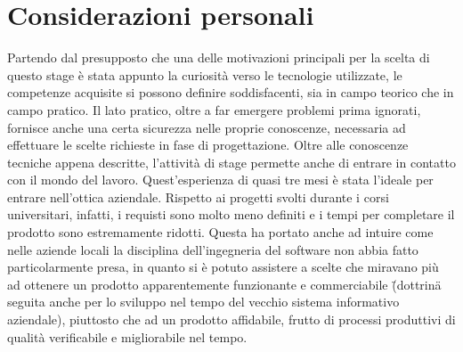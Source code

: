 \section{Considerazioni personali}
Partendo dal presupposto che una delle motivazioni principali per la scelta di questo stage \`e stata appunto la curiosit\`a verso le tecnologie utilizzate, le competenze acquisite si possono definire soddisfacenti, sia in campo teorico che in campo pratico. Il lato pratico, oltre a far emergere problemi prima ignorati, fornisce anche una certa sicurezza nelle proprie conoscenze, necessaria ad effettuare le scelte richieste in fase di progettazione. Oltre alle conoscenze tecniche appena descritte, l'attivit\`a di stage permette anche di entrare in contatto con il mondo del lavoro. Quest'esperienza di quasi tre mesi \`e stata l'ideale per entrare nell'ottica aziendale. Rispetto ai progetti svolti durante i corsi universitari, infatti, i requisti sono molto meno definiti e i tempi per completare il prodotto sono estremamente ridotti. Questa ha portato anche ad intuire come nelle aziende locali la disciplina dell'ingegneria del software non abbia fatto particolarmente presa, in quanto si \`e potuto assistere a scelte che miravano pi\`u ad ottenere un prodotto apparentemente funzionante e commerciabile (\"{}dottrina\"{} seguita anche per lo sviluppo nel tempo del vecchio sistema informativo aziendale), piuttosto che ad un prodotto affidabile, frutto di processi produttivi di qualit\`a verificabile e migliorabile nel tempo.

